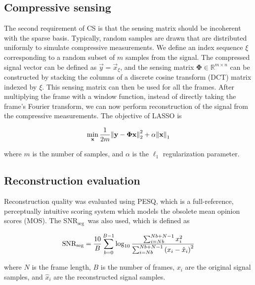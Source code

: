 \documentclass[10pt,a4paper,twoside]{article}
\newcommand{\snrseg}{SNR$_{\mathrm{seg}}$}
\begin{document}
\subsection{Compressive sensing}\label{ssec:cs}
The second requirement of CS is that the sensing matrix should be incoherent with the sparse basis. Typically, random samples are drawn that are distributed uniformly to simulate compressive measurements. We define an index sequence $\xi$ corresponding to a random subset of $m$ samples from the signal. The compressed signal vector can be defined as $\vec{y} = \vec{x}_\xi$, and the sensing matrix $\bm\Phi \in \mathbb{R}^{m \times n}$ can be constructed by stacking the columns of a discrete cosine transform (DCT) matrix indexed by $\xi$. This sensing matrix can then be used for all the frames. After multiplying the frame with a window function, instead of directly taking the frame's Fourier transform, we can now perform reconstruction of the signal from the compressive measurements. The objective of LASSO \cite{scikit-learn} is

\begin{equation}\label{eq:lasso}
	\min_{\text{\bfseries x}} \frac{1}{2m} \norm{\text{\bfseries y} - \bm\Phi \text{\bfseries x}}_2^2 + \alpha\norm{\text{\bfseries x}}_1
\end{equation}

\noindent where $m$ is the number of samples, and $\alpha$ is the $\ell_1$ regularization parameter.

\subsection{Reconstruction evaluation}\label{ssec:eval}
Reconstruction quality was evaluated using PESQ, which is a full-reference, perceptually intuitive scoring system which models the obsolete mean opinion scores (MOS). The \snrseg~was also used, which is defined \cite{Loizou} as

\begin{equation}\label{eq:snrseg}
	\mathrm{SNR_{seg}} = \frac{10}{B} \sum_{b=0}^{B-1} \log_{10} \frac{\sum_{i=Nb}^{Nb+N-1} x_i^2}{\sum_{i=Nb}^{Nb+N-1} \qty(x_i - \hat{x}_i)^2}
\end{equation}

\noindent where $N$ is the frame length, $B$ is the number of frames, $x_i$ are  the original signal samples, and $\hat{x}_i$ are the reconstructed signal samples.
\end{document}
